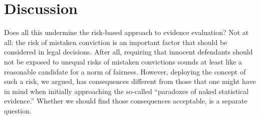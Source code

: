 \documentclass{article}
\begin{document}
\section{Discussion}


Does all this undermine the risk-based approach to evidence evaluation? Not at all: the risk of mistaken conviction is an important factor that should be considered in legal decisions. After all, requiring that innocent defendants should not be exposed to unequal risks of mistaken convictions sounds at least like a reasonable candidate for a norm of fairness. However, deploying the concept of such a risk, we argued, has consequences different from those that one might have in mind when initially approaching the so-called ``paradoxes of naked statistical evidence.'' Whether we should find those consequences acceptable, is a separate question.  









%
\end{document}
